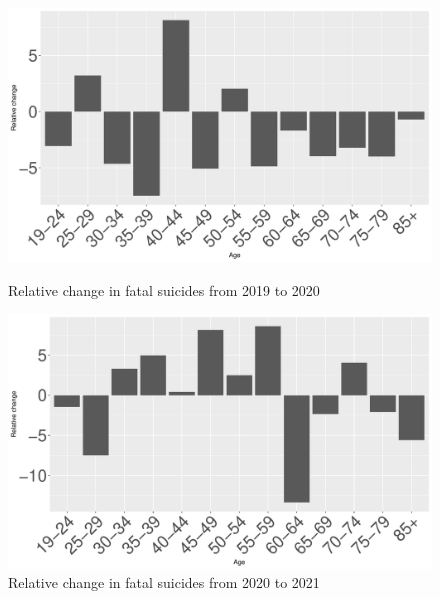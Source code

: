\documentclass{article}
\begin{document}
\begin{figure}[H]
	\begin{minipage}{0.45\textwidth}
		\includegraphics[width=\textwidth]{imgs/pl-fat-19_85-19_20.pdf}
		\caption{Relative change in fatal suicides from 2019 to 2020}
		\label{fig:pl-fat-19_85-19_20}
	\end{minipage}
	\hfill
	\begin{minipage}{0.45\textwidth}
		\includegraphics[width=\textwidth]{imgs/pl-fat-19_85-20_21.pdf}
		\caption{Relative change in fatal suicides from 2020 to 2021}
		\label{fig:pl-fat-19_85-20_21}
	\end{minipage}
\end{figure}
%
%
%
\end{document}
